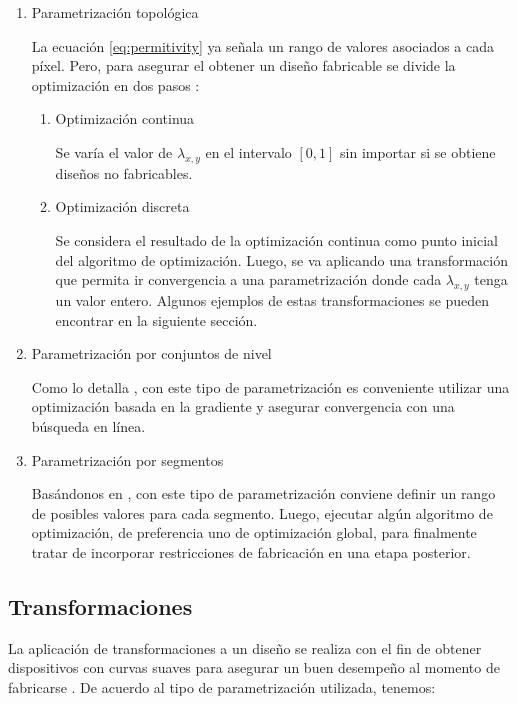 \begin{enumerate}


\item{Parametrización topológica}


La ecuación \ref{eq:permitivity} ya señala un rango de valores asociados a cada píxel. 
Pero, para asegurar el obtener un diseño fabricable se divide la optimización en dos pasos \citep{Su2020}:

  \begin{enumerate}
  \item Optimización continua
  
  Se varía el valor de $\lambda_{x,y}$ en el intervalo $[0, 1]$ sin importar si se obtiene diseños no fabricables.

  \item Optimización discreta

  Se considera el resultado de la optimización continua como punto inicial del algoritmo de optimización.
  Luego, se va aplicando una transformación que permita ir convergencia a una parametrización donde cada $\lambda_{x, y}$ tenga un valor entero.
  Algunos ejemplos de estas transformaciones se pueden encontrar en la siguiente sección.

  \end{enumerate}

\item{Parametrización por conjuntos de nivel}

Como lo detalla \cite{Piggott2017}, con este tipo de parametrización es conveniente utilizar una optimización basada en la gradiente y
asegurar convergencia con una búsqueda en línea.

\item{Parametrización por segmentos}

Basándonos en \cite{Prosopio-Galarza2019}, con este tipo de parametrización conviene definir un rango de posibles valores para cada segmento.
Luego, ejecutar algún algoritmo de optimización, de preferencia uno de optimización global, para finalmente tratar de incorporar restricciones de fabricación en una etapa posterior.

\end{enumerate}

\subsection{Transformaciones}

La aplicación de transformaciones a un diseño se realiza con el fin de obtener dispositivos con curvas suaves para asegurar un buen desempeño al momento de fabricarse \citep{Su2020}. 
De acuerdo al tipo de parametrización utilizada, tenemos:

